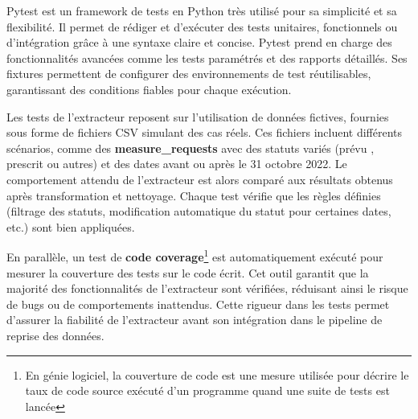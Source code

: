 Pytest est un framework de tests en Python très utilisé pour sa simplicité et sa flexibilité. Il permet de rédiger et d’exécuter des tests unitaires, fonctionnels ou d'intégration grâce à une syntaxe claire et concise\cite{wiki-pytest}. Pytest prend en charge des fonctionnalités avancées comme les tests paramétrés et des rapports détaillés. Ses fixtures permettent de configurer des environnements de test réutilisables, garantissant des conditions fiables pour chaque exécution. 

Les tests de l’extracteur reposent sur l’utilisation de données fictives, fournies sous forme de fichiers CSV simulant des cas réels. Ces fichiers incluent différents scénarios, comme des \textbf{measure\_requests} avec des statuts variés (\og prévu \fg{}, \og prescrit \fg{} ou autres) et des dates avant ou après le 31 octobre 2022. Le comportement attendu de l’extracteur est alors comparé aux résultats obtenus après transformation et nettoyage. Chaque test vérifie que les règles définies (filtrage des statuts, modification automatique du statut pour certaines dates, etc.) sont bien appliquées.

En parallèle, un test de \textbf{code coverage}\footnote{En génie logiciel, la couverture de code est une mesure utilisée pour décrire le taux de code source exécuté d'un programme quand une suite de tests est lancée\cite{wiki-coverage}} est automatiquement exécuté pour mesurer la couverture des tests sur le code écrit. Cet outil garantit que la majorité des fonctionnalités de l’extracteur sont vérifiées, réduisant ainsi le risque de bugs ou de comportements inattendus. Cette rigueur dans les tests permet d’assurer la fiabilité de l’extracteur avant son intégration dans le pipeline de reprise des données.
